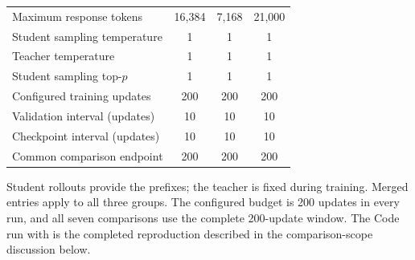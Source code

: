 \begin{table}[htbp]
\begin{tabular}{@{}lccc@{}}
    Maximum response tokens & 16,384 & 7,168 & 21,000 \\
    Student sampling temperature & 1 & 1 & 1 \\
    Teacher temperature & 1 & 1 & 1 \\
    Student sampling top-$p$ & 1 & 1 & 1 \\
    Configured training updates & 200 & 200 & 200 \\
    Validation interval (updates) & 10 & 10 & 10 \\
    Checkpoint interval (updates) & 10 & 10 & 10 \\
    \hline
    Common comparison endpoint & 200 & 200 & 200 \\
    \hline
  \end{tabular}
  \par\vspace{3pt}
  \begin{minipage}{\linewidth}
    \normalsize
    Student rollouts provide the prefixes; the teacher is fixed during training.
    Merged entries apply to all three groups. The configured budget is 200 updates
    in every run, and all seven comparisons use the complete 200-update window.
    The Code run with \QwenRLCode{} is the completed reproduction described in
    the comparison-scope discussion below.
  \end{minipage}
\end{table}
